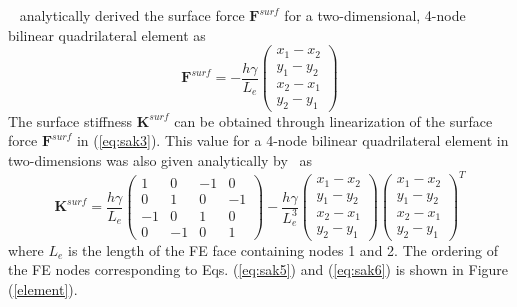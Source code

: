 \documentclass[final,authoryear,3p,times]{elsarticle}
\newcommand{\mbf}{\mathbf}
\begin{document}
~\citet{henannSM2014} analytically derived the surface force $\mbf{F}^{surf}$ for a two-dimensional, 4-node bilinear quadrilateral element as
\begin{equation}\label{eq:sak5} \mbf{F}^{surf}=-\frac{h\gamma}{L_{e}}\left(\begin{array}{cccc} {x_{1}-x_{2}} \\ {y_{1}-y_{2}} \\ {x_{2}-x_{1}} \\ {y_{2}-y_{1}} \end{array}\right)
\end{equation} 
The surface stiffness $\mbf{K}^{surf}$ can be obtained through linearization of the surface force $\mbf{F}^{surf}$ in (\ref{eq:sak3}).  This value for a 4-node bilinear quadrilateral element in two-dimensions was also given analytically by~\citet{henannSM2014} as
\begin{dmath} \label{eq:sak6} \mbf{K}^{surf}=\frac{h\gamma}{L_{e}}\left(\begin{array}{cccc} {1} & {0} & {-1} & {0} \\ {0} & {1} & {0} & {-1} \\ {-1} & {0} & {1} & {0} \\ {0} & {-1} & {0} & {1} \end{array}\right)-\frac{h\gamma}{L_{e}^{3}}\left(\begin{array}{cccc} {x_{1}-x_{2}} \\ {y_{1}-y_{2}} \\ {x_{2}-x_{1}} \\ {y_{2}-y_{1}} \end{array}\right)\left(\begin{array}{cccc} {x_{1}-x_{2}} \\ {y_{1}-y_{2}} \\ {x_{2}-x_{1}} \\ {y_{2}-y_{1}} \end{array}\right)^{T}
\end{dmath}
where $L_{e}$ is the length of the FE face containing nodes 1 and 2.  The ordering of the FE nodes corresponding to Eqs. (\ref{eq:sak5}) and (\ref{eq:sak6}) is shown in Figure (\ref{element}).  
\end{document}

